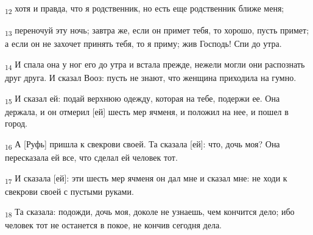 \begin{tcolorbox}
\textsubscript{12} хотя и правда, что я родственник, но есть еще родственник ближе меня;
\end{tcolorbox}
\begin{tcolorbox}
\textsubscript{13} переночуй эту ночь; завтра же, если он примет тебя, то хорошо, пусть примет; а если он не захочет принять тебя, то я приму; жив Господь! Спи до утра.
\end{tcolorbox}
\begin{tcolorbox}
\textsubscript{14} И спала она у ног его до утра и встала прежде, нежели могли они распознать друг друга. И сказал Вооз: пусть не знают, что женщина приходила на гумно.
\end{tcolorbox}
\begin{tcolorbox}
\textsubscript{15} И сказал ей: подай верхнюю одежду, которая на тебе, подержи ее. Она держала, и он отмерил [ей] шесть мер ячменя, и положил на нее, и пошел в город.
\end{tcolorbox}
\begin{tcolorbox}
\textsubscript{16} А [Руфь] пришла к свекрови своей. Та сказала [ей]: что, дочь моя? Она пересказала ей все, что сделал ей человек тот.
\end{tcolorbox}
\begin{tcolorbox}
\textsubscript{17} И сказала [ей]: эти шесть мер ячменя он дал мне и сказал мне: не ходи к свекрови своей с пустыми руками.
\end{tcolorbox}
\begin{tcolorbox}
\textsubscript{18} Та сказала: подожди, дочь моя, доколе не узнаешь, чем кончится дело; ибо человек тот не останется в покое, не кончив сегодня дела.
\end{tcolorbox}
